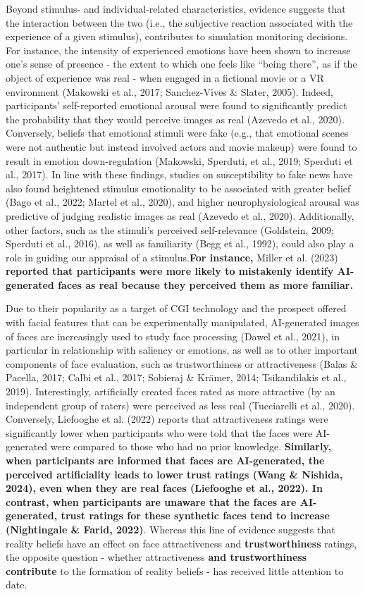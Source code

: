 \documentclass[
  man,
  floatsintext,
  longtable,
  nolmodern,
  notxfonts,
  notimes,
  colorlinks=true,linkcolor=blue,citecolor=blue,urlcolor=blue]{apa7}
\begin{document}
Beyond stimulus- and individual-related characteristics, evidence
suggests that the interaction between the two (i.e., the subjective
reaction associated with the experience of a given stimulus),
contributes to simulation monitoring decisions. For instance, the
intensity of experienced emotions have been shown to increase one's
sense of presence - the extent to which one feels like ``being there'',
as if the object of experience was real - when engaged in a fictional
movie or a VR environment (Makowski et al., 2017; Sanchez-Vives \&
Slater, 2005). Indeed, participants' self-reported emotional arousal
were found to significantly predict the probability that they would
perceive images as real (Azevedo et al., 2020). Conversely, beliefs that
emotional stimuli were fake (e.g., that emotional scenes were not
authentic but instead involved actors and movie makeup) were found to
result in emotion down-regulation (Makowski, Sperduti, et al., 2019;
Sperduti et al., 2017). In line with these findings, studies on
susceptibility to fake news have also found heightened stimulus
emotionality to be associated with greater belief (Bago et al., 2022;
Martel et al., 2020), and higher neurophysiological arousal was
predictive of judging realistic images as real (Azevedo et al., 2020).
Additionally, other factors, such as the stimuli's perceived
self-relevance (Goldstein, 2009; Sperduti et al., 2016), as well as
familiarity (Begg et al., 1992), could also play a role in guiding our
appraisal of a stimulus.\textbf{For instance,} Miller et al. (2023)
\textbf{reported that participants were more likely to mistakenly
identify AI-generated faces as real because they perceived them as more
familiar.}

Due to their popularity as a target of CGI technology and the prospect
offered with facial features that can be experimentally manipulated,
AI-generated images of faces are increasingly used to study face
processing (Dawel et al., 2021), in particular in relationship with
saliency or emotions, as well as to other important components of face
evaluation, such as trustworthiness or attractiveness (Balas \& Pacella,
2017; Calbi et al., 2017; Sobieraj \& Krämer, 2014; Tsikandilakis et
al., 2019). Interestingly, artificially created faces rated as more
attractive (by an independent group of raters) were perceived as less
real (Tucciarelli et al., 2020). Conversely, Liefooghe et al. (2022)
reports that attractiveness ratings were significantly lower when
participants who were told that the faces were AI-generated were
compared to those who had no prior knowledge. \textbf{Similarly, when
participants are informed that faces are AI-generated, the perceived
artificiality leads to lower trust ratings (Wang \& Nishida, 2024), even
when they are real faces (Liefooghe et al., 2022). In contrast, when
participants are unaware that the faces are AI-generated, trust ratings
for these synthetic faces tend to increase (Nightingale \& Farid,
2022)}. Whereas this line of evidence suggests that reality beliefs have
an effect on face attractiveness and \textbf{trustworthiness} ratings,
the opposite question - whether attractiveness \textbf{and
trustworthiness contribute} to the formation of reality beliefs - has
received little attention to date.
\end{document}
